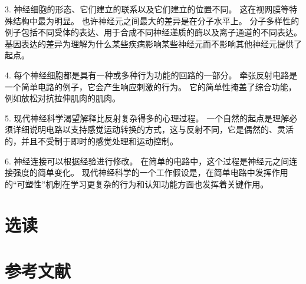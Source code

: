 3. 神经细胞的形态、它们建立的联系以及它们建立的位置不同。 这在视网膜等特殊结构中最为明显。 也许神经元之间最大的差异是在分子水平上。 分子多样性的例子包括不同受体的表达、用于合成不同神经递质的酶以及离子通道的不同表达。 基因表达的差异为理解为什么某些疾病影响某些神经元而不影响其他神经元提供了起点。

4. 每个神经细胞都是具有一种或多种行为功能的回路的一部分。 牵张反射电路是一个简单电路的例子，它会产生响应刺激的行为。 它的简单性掩盖了综合功能，例如放松对抗拉伸肌肉的肌肉。

5. 现代神经科学渴望解释比反射复杂得多的心理过程。 一个自然的起点是理解必须详细说明电路以支持感觉运动转换的方式，这与反射不同，它是偶然的、灵活的，并且不受制于即时的感觉处理和运动控制。

6. 神经连接可以根据经验进行修改。 在简单的电路中，这个过程是神经元之间连接强度的简单变化。 现代神经科学的一个工作假设是，在简单电路中发挥作用的“可塑性”机制在学习更复杂的行为和认知功能方面也发挥着关键作用。


\section{选读}

\section{参考文献}












